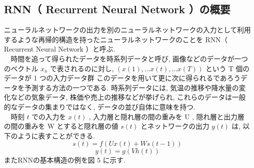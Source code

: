 \subsection{RNN（ Recurrent Neural Network ）の概要}
ニューラルネットワークの出力を別のニューラルネットワークの入力として利用するような再帰的構造を持ったニューラルネットワークのことを RNN（ Recurrent Neural Network ）と呼ぶ.\\
　時間を追って得られたデータを時系列データと呼び,
画像などのデータが一つのベクトル $x_n$ で表されるのに対し,
$(x(1),… x(t),… x(T))$ という T 個のデータが 1 つの入力データ群
このデータを用いて更に次に得られるであろうデータを予測する方法の一つである.
時系列データには,
気温の推移や降水量の変化などの気象データ,
株価や売上の推移などが挙げられ,
これらのデータは一般的なデータの集まりではなく,
データの並び自体に意味を持つ.\\
　時刻 $t$ での入力を $x(t)$ ,
入力層と隠れ層の間の重みを U ,
隠れ層と出力層の間の重みを W とすると隠れ層の値 $s(t)$ とネットワークの出力 $y(t)$ は,
以下のように表すことができる.
\begin{equation}
  s(t) = f(Ux(t) + Ws(t-1))
  \label{eq:RNN1}
\end{equation}
\begin{equation}
  y(t) = g(Vh(t))
  \label{eq:RNN2}
\end{equation}
またRNNの基本構造の例を図 5 に示す.
